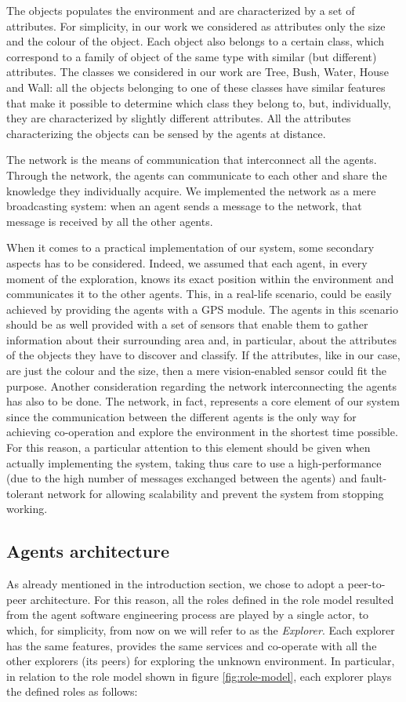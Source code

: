 \documentclass[a4paper, 10pt, conference]{ieeeconf}      %
\begin{document}
The objects populates the environment and are characterized by a set of attributes. For simplicity, in our work we considered as attributes only the size and the colour of the object. Each object also belongs to a certain class, which correspond to a family of object of the same type with similar (but different) attributes. The classes we considered in our work are Tree, Bush, Water, House and Wall: all the objects belonging to one of these classes have similar features that make it possible to determine which class they belong to, but, individually, they are characterized by slightly different attributes. All the attributes characterizing the objects can be sensed by the agents at distance. 

The network is the means of communication that interconnect all the agents. Through the network, the agents can communicate to each other and share the knowledge they individually acquire. We implemented the network as a mere broadcasting system: when an agent sends a message to the network, that message is received by all the other agents. 

When it comes to a practical implementation of our system, some secondary aspects has to be considered. Indeed, we assumed that each agent, in every moment of the exploration, knows its exact position within the environment and communicates it to the other agents. This, in a real-life scenario, could be easily achieved by providing the agents with a GPS module. The agents in this scenario should be as well provided with a set of sensors that enable them to gather information about their surrounding area and, in particular, about the attributes of the objects they have to discover and classify. If the attributes, like in our case, are just the colour and the size, then a mere vision-enabled sensor could fit the purpose. Another consideration regarding the network interconnecting the agents has also to be done. The network, in fact, represents a core element of our system since the communication between the different agents is the only way for achieving co-operation and explore the environment in the shortest time possible. For this reason, a particular attention to this element should be given when actually implementing the system, taking thus care to use a high-performance (due to the high number of messages exchanged between the agents) and fault-tolerant network for allowing scalability and prevent the system from stopping working. 

\subsection{Agents architecture}\label{sec:agents-architecture}
As already mentioned in the introduction section, we chose to adopt a peer-to-peer architecture. For this reason, all the roles defined in the role model resulted from the agent software engineering process are played by a single actor, to which, for simplicity, from now on we will refer to as the \emph{Explorer}. Each explorer has the same features, provides the same services and co-operate with all the other explorers (its peers) for exploring the unknown environment. In particular, in relation to the role model shown in figure \ref{fig:role-model}, each explorer plays the defined roles as follows: 
\end{document}
